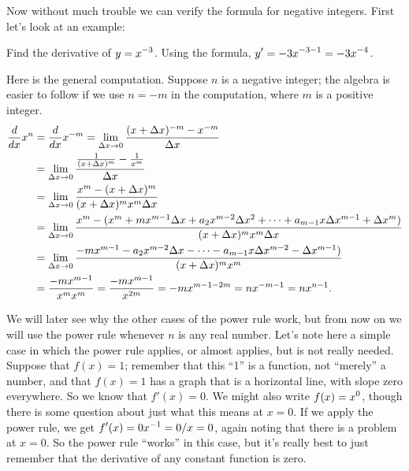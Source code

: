 Now without much trouble we can verify the formula for negative
integers. First let's look at an example:

\begin{example} Find the derivative of $\displaystyle y=x^{-3}$. Using the formula,
$\displaystyle y'=-3x^{-3-1}=-3x^{-4}$. 
\end{example}

Here is the general computation. Suppose $n$ is a negative integer;
the algebra is easier to follow if we use $n=-m$ in the computation,
where $m$ is a positive integer.
\begin{align*}
{d\over dx}x^n &= {d\over dx}x^{-m} =
\lim_{\Delta x\to0} {(x+\Delta x)^{-m}-x^{-m}\over \Delta
  x} \\
&=\lim_{\Delta x\to0} { {1\over (x+\Delta x)^m} - {1\over x^m} \over
  \Delta x}  \\
&=\lim_{\Delta x\to0} { x^m - (x+\Delta x)^m \over
(x+\Delta x)^m x^m \Delta x}  \\
&=\lim_{\Delta x\to0} { x^m - (x^m + mx^{m-1}\Delta x + a_2x^{m-2}\Delta x^2+\cdots+
a_{m-1}x\Delta x^{m-1} + \Delta x^m)\over
(x+\Delta x)^m x^m \Delta x}  \\
&=\lim_{\Delta x\to0} { -mx^{m-1} - a_2x^{m-2}\Delta x-\cdots-
a_{m-1}x\Delta x^{m-2} - \Delta x^{m-1})\over
(x+\Delta x)^m x^m}  \\
&={ -mx^{m-1} \over x^mx^m}=
{ -mx^{m-1} \over x^{2m}}=
-mx^{m-1-2m}= nx^{-m-1} = nx^{n-1}. \\
\end{align*}

We will later see why the other cases of the power rule work, but from
now on we will use the power rule whenever $n$ is any real number.
Let's note here a simple case in which the power rule applies, or
almost applies, but is not really needed. Suppose that $f(x)=1$;
remember that this ``1'' is a function, not ``merely'' a number, and
that $f(x)=1$ has a graph that is a horizontal line, with slope zero
everywhere. So we know that $f'(x)=0$. We might also write $\displaystyle f(x)=x^0$,
though there is some question about just what this means at $x=0$. If
we apply the power rule, we get $\displaystyle f'(x)=0x^{-1}=0/x=0$, again noting
that there is a problem at $x=0$. So the power rule ``works'' in this
case, but it's really best to just remember that the derivative of any
constant function is zero.

